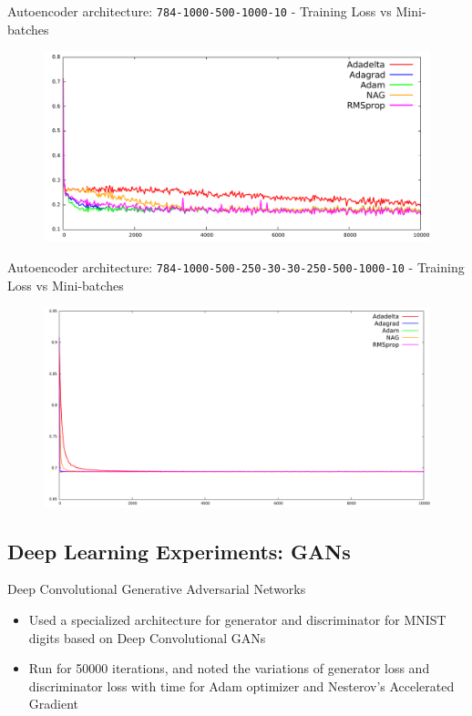 \documentclass[10pt]{beamer}
\begin{document}
\begin{frame}{Autoencoder architecture: \texttt{784-1000-500-1000-10} - Training Loss vs Mini-batches}
\begin{figure}
\centering
\includegraphics[width=\linewidth]{./images/auto-1.pdf}
\end{figure}
\end{frame}
\begin{frame}{Autoencoder architecture: \texttt{784-1000-500-250-30-30-250-500-1000-10} - Training Loss vs Mini-batches} %
\begin{figure}
\centering
\includegraphics[width=0.9\linewidth]{./images/auto-2.pdf}
\end{figure}
\end{frame}

\subsection{Deep Learning Experiments: GANs}
\begin{frame}{Deep Convolutional Generative Adversarial Networks} %
\begin{itemize}
\item<1->{Used a specialized architecture for generator and discriminator for MNIST digits based on Deep Convolutional GANs}
\item<2->{Run for 50000 iterations, and noted the variations of generator loss and discriminator loss with time for Adam optimizer and Nesterov's Accelerated Gradient}
\end{itemize}
\end{frame}
\end{document}
